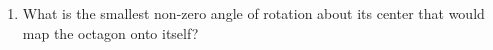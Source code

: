 \documentclass[12pt, twoside]{article}
\begin{document}
\begin{enumerate}
\item What is the smallest non-zero angle of rotation about its center that would map the octagon onto itself?
\begin{center}
  \end{center}




\end{enumerate}
\end{document}
